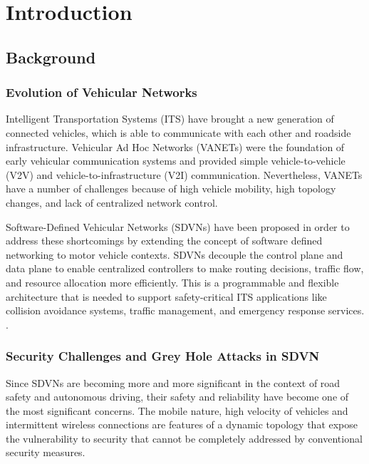 \documentclass[12pt, a4paper]{report}
\newcommand{\mypar}{\vspace{0.8em}\noindent}
\begin{document}
\newpage

\renewcommand{\thepage}{\arabic{page}} %
\setcounter{page}{1} %

\chapter{Introduction}
\section{Background}

\subsection{Evolution of Vehicular Networks}
Intelligent Transportation Systems (ITS) have brought a new generation of connected vehicles, which is able to communicate with each other and roadside infrastructure. Vehicular Ad Hoc Networks (VANETs) were the foundation of early vehicular communication systems and provided simple vehicle-to-vehicle (V2V) and vehicle-to-infrastructure (V2I) communication. Nevertheless, VANETs have a number of challenges because of high vehicle mobility, high topology changes, and lack of centralized network control.

\mypar
Software-Defined Vehicular Networks (SDVNs) have been proposed in order to address these shortcomings by extending the concept of software defined networking to motor vehicle contexts. SDVNs decouple the control plane and data plane to enable centralized controllers to make routing decisions, traffic flow, and resource allocation more efficiently. This is a programmable and flexible architecture that is needed to support safety-critical ITS applications like collision avoidance systems, traffic management, and emergency response services. \cite{ieee10402120, islam2021sdvn}.


\subsection{Security Challenges and Grey Hole Attacks in SDVN}

Since SDVNs are becoming more and more significant in the context of road safety and autonomous driving, their safety and reliability have become one of the most significant concerns. The mobile nature, high velocity of vehicles and intermittent wireless connections are features of a dynamic topology that expose the vulnerability to security that cannot be completely addressed by conventional security measures.
\end{document}
